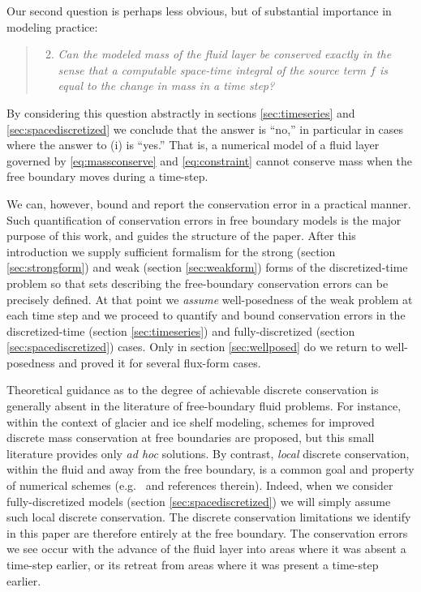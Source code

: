 \documentclass[final,leqno,onefignum,onetabnum]{siamltex1213bueler}
\begin{document}
Our second question is perhaps less obvious, but of substantial importance in modeling practice:
  \begin{quote}
  \renewcommand{\labelenumi}{(\roman{enumi})}
  \begin{enumerate}
  \setcounter{enumi}{1}
  \item \emph{Can the modeled mass of the fluid layer be conserved exactly in the sense that a computable space-time integral of the source term $f$ is equal to the change in mass in a time step?}
  \end{enumerate}
  \end{quote}
By considering this question abstractly in sections \ref{sec:timeseries} and \ref{sec:spacediscretized} we conclude that the answer is ``no,'' in particular in cases where the answer to (i) is ``yes.''  That is, a numerical model of a fluid layer governed by \eqref{eq:massconserve} and \eqref{eq:constraint} cannot conserve mass when the free boundary moves during a time-step.

We can, however, bound and report the conservation error in a practical manner.  Such quantification of conservation errors in free boundary models is the major purpose of this work, and guides the structure of the paper.  After this introduction we supply sufficient formalism for the strong (section \ref{sec:strongform}) and weak (section \ref{sec:weakform}) forms of the discretized-time problem so that sets describing the free-boundary conservation errors can be precisely defined.  At that point we \emph{assume} well-posedness of the weak problem at each time step and we proceed to quantify and bound conservation errors in the discretized-time (section \ref{sec:timeseries}) and fully-discretized (section \ref{sec:spacediscretized}) cases.  Only in section \ref{sec:wellposed} do we return to well-posedness and proved it for several flux-form cases.

Theoretical guidance as to the degree of achievable discrete conservation is generally absent in the literature of free-boundary fluid problems.  For instance, within the context of glacier \cite{JaroschSchoofAnslow2013} and ice shelf \cite{Albrechtetal2011} modeling, schemes for improved discrete mass conservation at free boundaries are proposed, but this small literature provides only \emph{ad hoc} solutions.  By contrast, \emph{local} discrete conservation, within the fluid and away from the free boundary, is a common goal and property of numerical schemes (e.g.~\cite{LeVeque2002} and references therein).  Indeed, when we consider fully-discretized models (section \ref{sec:spacediscretized}) we will simply assume such local discrete conservation.  The discrete conservation limitations we identify in this paper are therefore entirely at the free boundary.  The conservation errors we see  occur with the advance of the fluid layer into areas where it was absent a time-step earlier, or its retreat from areas where it was present a time-step earlier.
\end{document}
